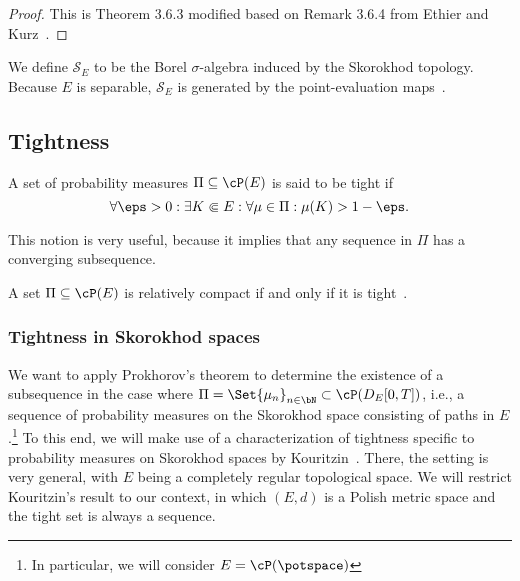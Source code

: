 \begin{proof}
  This is Theorem 3.6.3 modified based on Remark 3.6.4 from Ethier and Kurz~\cite{ethierMarkovProcessesCharacterization1985}.
\end{proof}

We define \(\mathscr{S}_{E}\) to be the Borel \(\sigma\)-algebra induced by the Skorokhod topology.
Because \(E\) is separable, \(\mathscr{S}_{E}\) is generated by the point-evaluation maps~\cite[Proposition 3.7.1]{ethierMarkovProcessesCharacterization1985}.

\subsection{Tightness}

\begin{definition}
  A set of probability measures \(\Pi \subseteq \cP(E)\) is said to be tight if
  \begin{equation}
    \forall \eps > 0 : \exists K \Subset E : \forall \mu \in \Pi : \mu(K) > 1 - \eps.
  \end{equation}
\end{definition}

This notion is very useful, because it implies that any sequence in \(\Pi\) has a converging subsequence.

\begin{theorem}[Prokhorov]
  A set \( \Pi \subseteq \cP(E) \) is relatively compact if and only if it is tight~\cite[57-65]{billingsleyConvergenceProbabilityMeasures1999}.
\end{theorem}

\subsubsection{Tightness in Skorokhod spaces}

We want to apply Prokhorov's theorem to determine the existence of a subsequence in the case where \( \Pi = \Set{\mu_n}_{n\in\bN} \subset \cP(D_{E}[0,T]) \), i.e., a sequence of probability measures on the Skorokhod space consisting of paths in \(E\).\footnote{In particular, we will consider \(E = \cP(\potspace)\)}
To this end, we will make use of a characterization of tightness specific to probability measures on Skorokhod spaces by Kouritzin~\cite{kouritzinTightnessProbabilityMeasures2015}.
There, the setting is very general, with \(E\) being a completely regular topological space.
We will restrict Kouritzin's result to our context, in which \((E,d)\) is a Polish metric space and the tight set is always a sequence.

